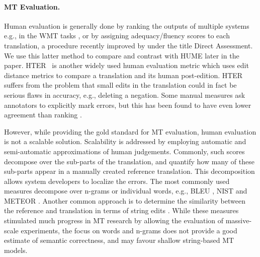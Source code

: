 \documentclass[11pt,letterpaper]{article}
\def\perscite#1{\newcite{#1}}
\def\parcite#1{\cite{#1}}
\begin{document}
\paragraph{MT Evaluation.}
Human evaluation is generally done by ranking the outputs of multiple systems
e.g., in the WMT tasks \parcite{bojar2015findings}, or by assigning
adequacy/fluency scores to each translation, a procedure recently improved
by \perscite{graham2015accurate} under the title Direct Assessment. We use this latter method to compare and
contrast
with HUME later in the paper. HTER~\parcite{snover2006study} is another widely used human evaluation metric
which uses edit distance metrics to compare a translation and its human 
post-edition. HTER suffers from the problem that small edits in the translation
could in fact be serious flaws in accuracy, e.g., deleting a negation. 
Some manual measures ask annotators to explicitly mark errors, but this has
been found to have even lower agreement than ranking \parcite{lommel:etal:mqm-iaa:2014}.

However, while providing the gold standard for MT evaluation, human evaluation
is not a scalable solution.
Scalability is addressed by employing automatic and semi-automatic approximations of human
judgements. Commonly, such scores decompose over the sub-parts of
the translation, and quantify how many of these sub-parts appear in a manually
created reference translation.
This decomposition allows system developers to localize the errors.
The most commonly used measures decompose over n-grams or individual words, e.g., 
BLEU \parcite{Papineni:2002}, NIST \parcite{Doddington:2002} and METEOR \parcite{Banerjee:2005}.
Another common approach is to determine the similarity between the reference and translation
in terms of string edits \parcite{snover2006study}.
While these measures stimulated much progress in MT research by allowing
the evaluation of massive-scale experiments, the focus on words and n-grams does
not provide a good estimate of semantic correctness, and may favour shallow string-based
MT models.

\end{document}
